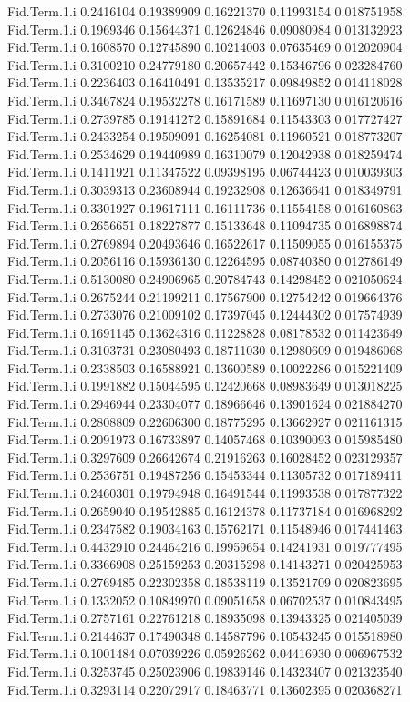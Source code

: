 \documentclass[11pt]{article} %
\begin{document}
\begin{Schunk}
\begin{Soutput}
Fid.Term.1.i 0.2416104 0.19389909 0.16221370 0.11993154 0.018751958
Fid.Term.1.i 0.1969346 0.15644371 0.12624846 0.09080984 0.013132923
Fid.Term.1.i 0.1608570 0.12745890 0.10214003 0.07635469 0.012020904
Fid.Term.1.i 0.3100210 0.24779180 0.20657442 0.15346796 0.023284760
Fid.Term.1.i 0.2236403 0.16410491 0.13535217 0.09849852 0.014118028
Fid.Term.1.i 0.3467824 0.19532278 0.16171589 0.11697130 0.016120616
Fid.Term.1.i 0.2739785 0.19141272 0.15891684 0.11543303 0.017727427
Fid.Term.1.i 0.2433254 0.19509091 0.16254081 0.11960521 0.018773207
Fid.Term.1.i 0.2534629 0.19440989 0.16310079 0.12042938 0.018259474
Fid.Term.1.i 0.1411921 0.11347522 0.09398195 0.06744423 0.010039303
Fid.Term.1.i 0.3039313 0.23608944 0.19232908 0.12636641 0.018349791
Fid.Term.1.i 0.3301927 0.19617111 0.16111736 0.11554158 0.016160863
Fid.Term.1.i 0.2656651 0.18227877 0.15133648 0.11094735 0.016898874
Fid.Term.1.i 0.2769894 0.20493646 0.16522617 0.11509055 0.016155375
Fid.Term.1.i 0.2056116 0.15936130 0.12264595 0.08740380 0.012786149
Fid.Term.1.i 0.5130080 0.24906965 0.20784743 0.14298452 0.021050624
Fid.Term.1.i 0.2675244 0.21199211 0.17567900 0.12754242 0.019664376
Fid.Term.1.i 0.2733076 0.21009102 0.17397045 0.12444302 0.017574939
Fid.Term.1.i 0.1691145 0.13624316 0.11228828 0.08178532 0.011423649
Fid.Term.1.i 0.3103731 0.23080493 0.18711030 0.12980609 0.019486068
Fid.Term.1.i 0.2338503 0.16588921 0.13600589 0.10022286 0.015221409
Fid.Term.1.i 0.1991882 0.15044595 0.12420668 0.08983649 0.013018225
Fid.Term.1.i 0.2946944 0.23304077 0.18966646 0.13901624 0.021884270
Fid.Term.1.i 0.2808809 0.22606300 0.18775295 0.13662927 0.021161315
Fid.Term.1.i 0.2091973 0.16733897 0.14057468 0.10390093 0.015985480
Fid.Term.1.i 0.3297609 0.26642674 0.21916263 0.16028452 0.023129357
Fid.Term.1.i 0.2536751 0.19487256 0.15453344 0.11305732 0.017189411
Fid.Term.1.i 0.2460301 0.19794948 0.16491544 0.11993538 0.017877322
Fid.Term.1.i 0.2659040 0.19542885 0.16124378 0.11737184 0.016968292
Fid.Term.1.i 0.2347582 0.19034163 0.15762171 0.11548946 0.017441463
Fid.Term.1.i 0.4432910 0.24464216 0.19959654 0.14241931 0.019777495
Fid.Term.1.i 0.3366908 0.25159253 0.20315298 0.14143271 0.020425953
Fid.Term.1.i 0.2769485 0.22302358 0.18538119 0.13521709 0.020823695
Fid.Term.1.i 0.1332052 0.10849970 0.09051658 0.06702537 0.010843495
Fid.Term.1.i 0.2757161 0.22761218 0.18935098 0.13943325 0.021405039
Fid.Term.1.i 0.2144637 0.17490348 0.14587796 0.10543245 0.015518980
Fid.Term.1.i 0.1001484 0.07039226 0.05926262 0.04416930 0.006967532
Fid.Term.1.i 0.3253745 0.25023906 0.19839146 0.14323407 0.021323540
Fid.Term.1.i 0.3293114 0.22072917 0.18463771 0.13602395 0.020368271

\end{Soutput}
\end{Schunk}
\end{document}
